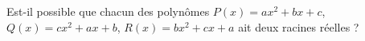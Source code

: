 Est-il possible que chacun des polynômes $P(x) = ax^2 + bx + c$, $Q(x) = cx^2 + ax + b$, $R(x) = bx^2 + cx + a$ ait deux racines réelles ?
